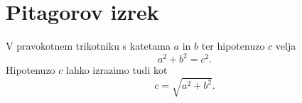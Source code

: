 \documentclass{article}
\begin{document}
\section*{Pitagorov izrek}
V pravokotnem trikotniku s katetama \(a\) in \(b\) ter hipotenuzo \(c\) velja
\[ a^2 + b^2 = c^2. \]
Hipotenuzo \(c\) lahko izrazimo tudi kot
\[ c = \sqrt{a^2 + b^2}. \]
\end{document}
